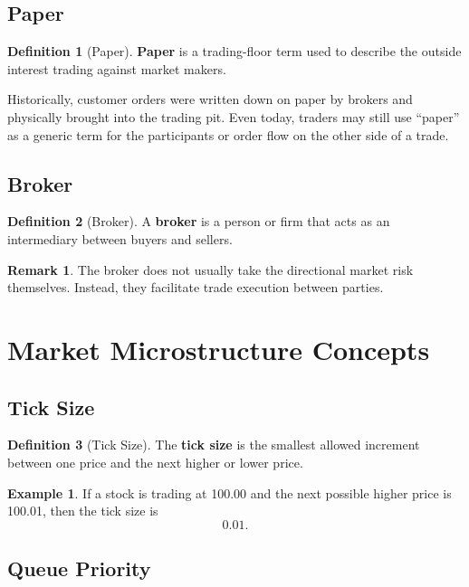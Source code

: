 \documentclass[11pt]{article}
\theoremstyle{definition}
\newtheorem{definition}{Definition}[section]
\newtheorem{example}{Example}[section]
\newtheorem{remark}{Remark}[section]
\begin{document}
\subsection{Paper}

\begin{definition}[Paper]
\textbf{Paper} is a trading-floor term used to describe the outside interest trading against market makers.
\end{definition}

Historically, customer orders were written down on paper by brokers and physically brought into the trading pit. Even today, traders may still use ``paper'' as a generic term for the participants or order flow on the other side of a trade.

\subsection{Broker}

\begin{definition}[Broker]
A \textbf{broker} is a person or firm that acts as an intermediary between buyers and sellers.
\end{definition}

\begin{remark}
The broker does not usually take the directional market risk themselves. Instead, they facilitate trade execution between parties.
\end{remark}

\section{Market Microstructure Concepts}

\subsection{Tick Size}

\begin{definition}[Tick Size]
The \textbf{tick size} is the smallest allowed increment between one price and the next higher or lower price.
\end{definition}

\begin{example}
If a stock is trading at 100.00 and the next possible higher price is 100.01, then the tick size is
\[
0.01.
\]
\end{example}

\subsection{Queue Priority}
\end{document}
